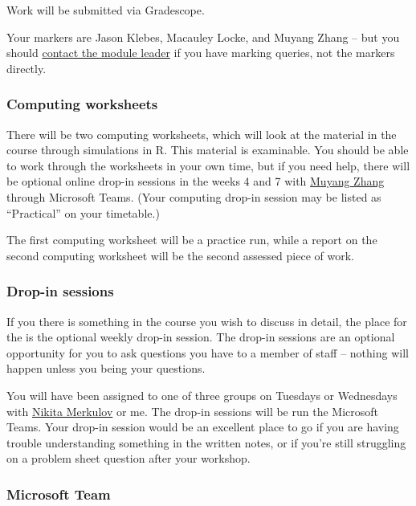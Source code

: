 \documentclass[
  a4paper,
]{article}
\theoremstyle{definition}
\theoremstyle{definition}
\theoremstyle{definition}
\theoremstyle{remark}
\begin{document}
Work will be submitted via Gradescope.

Your markers are Jason Klebes, Macauley Locke, and Muyang Zhang -- but you should \href{mailto:m.aldridge@leeds.ac.uk}{contact the module leader} if you have marking queries, not the markers directly.

\hypertarget{about-computing}{%
\subsubsection*{Computing worksheets}\label{about-computing}}

There will be two computing worksheets, which will look at the material in the course through simulations in R. This material is examinable. You should be able to work through the worksheets in your own time, but if you need help, there will be optional online drop-in sessions in the weeks 4 and 7 with \href{https://eps.leeds.ac.uk/maths/pgr/6422/muyang-zhang}{Muyang Zhang} through Microsoft Teams. (Your computing drop-in session may be listed as ``Practical'' on your timetable.)

The first computing worksheet will be a practice run, while a report on the second computing worksheet will be the second assessed piece of work.

\hypertarget{dropin}{%
\subsubsection*{Drop-in sessions}\label{dropin}}

If you there is something in the course you wish to discuss in detail, the place for the is the optional weekly drop-in session. The drop-in sessions are an optional opportunity for you to ask questions you have to a member of staff -- nothing will happen unless you being your questions.

You will have been assigned to one of three groups on Tuesdays or Wednesdays with \href{https://eps.leeds.ac.uk/maths/pgr/4992/nikita-merkulov}{Nikita Merkulov} or me. The drop-in sessions will be run the Microsoft Teams. Your drop-in session would be an excellent place to go if you are having trouble understanding something in the written notes, or if you're still struggling on a problem sheet question after your workshop.

\hypertarget{team}{%
\subsubsection*{Microsoft Team}\label{team}}
\end{document}

